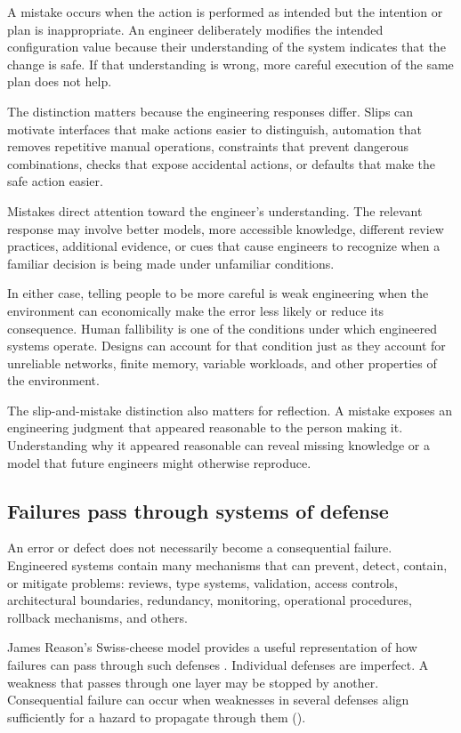 A mistake occurs when the action is performed as intended but the intention or plan is
inappropriate. An engineer deliberately modifies the intended configuration value because their
understanding of the system indicates that the change is safe. If that understanding is wrong, more
careful execution of the same plan does not help.

The distinction matters because the engineering responses differ. Slips can motivate interfaces
that make actions easier to distinguish, automation that removes repetitive manual operations,
constraints that prevent dangerous combinations, checks that expose accidental actions, or defaults
that make the safe action easier.

Mistakes direct attention toward the engineer's understanding. The relevant response may involve
better models, more accessible knowledge, different review practices, additional evidence, or cues
that cause engineers to recognize when a familiar decision is being made under unfamiliar
conditions.

In either case, telling people to be more careful is weak engineering when the environment can
economically make the error less likely or reduce its consequence. Human fallibility is one of the
conditions under which engineered systems operate. Designs can account for that condition just as
they account for unreliable networks, finite memory, variable workloads, and other properties of
the environment.

The slip-and-mistake distinction also matters for reflection. A mistake exposes an engineering
judgment that appeared reasonable to the person making it. Understanding why it appeared reasonable
can reveal missing knowledge or a model that future engineers might otherwise reproduce.

\subsection{Failures pass through systems of defense}\label{sec-defenses}

An error or defect does not necessarily become a consequential failure. Engineered systems contain
many mechanisms that can prevent, detect, contain, or mitigate problems: reviews, type systems,
validation, access controls, architectural boundaries, redundancy, monitoring, operational
procedures, rollback mechanisms, and others.

James Reason's Swiss-cheese model provides a useful representation of how failures can pass through
such defenses \citep{reason1990humanerror}. Individual defenses are imperfect. A weakness that passes through one
layer may be stopped by another. Consequential failure can occur when weaknesses in several
defenses align sufficiently for a hazard to propagate through them (\citet{fig-defenses-alignment}).

